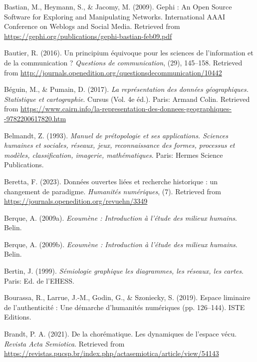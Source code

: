 \documentclass[
  a4paper,
  DIV=11,
  numbers=noendperiod]{scrreprt}
\newlength{\cslhangindent}
\newenvironment{CSLReferences}[2] %
 {\begin{list}{}{%
  \setlength{\itemindent}{0pt}
  \setlength{\leftmargin}{0pt}
  \setlength{\parsep}{0pt}
  \ifodd #1
   \setlength{\leftmargin}{\cslhangindent}
   \setlength{\itemindent}{-1\cslhangindent}
  \fi
  \setlength{\itemsep}{#2\baselineskip}}}
 {\end{list}}
\begin{document}
\begin{CSLReferences}{1}{0}
Bastian, M., Heymann, S., \& Jacomy, M. (2009). Gephi : An Open Source
Software for Exploring and Manipulating Networks. International AAAI
Conference on Weblogs and Social Media. Retrieved from
\url{https://gephi.org/publications/gephi-bastian-feb09.pdf}

Bautier, R. (2016). Un principium équivoque pour les sciences de
l{'}information et de la communication ? \emph{Questions de
communication}, (29), 145--158. Retrieved from
\url{http://journals.openedition.org/questionsdecommunication/10442}

Béguin, M., \& Pumain, D. (2017). \emph{La représentation des données
géographiques. Statistique et cartographie}. Cursus (Vol. 4e éd.).
Paris: Armand Colin. Retrieved from
\url{https://www.cairn.info/la-representation-des-donnees-geographiques--9782200617820.htm}

Belmandt, Z. (1993). \emph{Manuel de prétopologie et ses applications.
Sciences humaines et sociales, réseaux, jeux, reconnaissance des formes,
processus et modèles, classification, imagerie, mathématiques}. Paris:
Hermes Science Publications.

Beretta, F. (2023). Données ouvertes liées et recherche historique : un
changement de paradigme. \emph{Humanités numériques}, (7). Retrieved
from \url{https://journals.openedition.org/revuehn/3349}

Berque, A. (2009a). \emph{Ecoumène : Introduction à l'étude des milieux
humains}. Belin.

Berque, A. (2009b). \emph{Ecoumène : Introduction à l'étude des milieux
humains}. Belin.

Bertin, J. (1999). \emph{Sémiologie graphique les diagrammes, les
réseaux, les cartes}. Paris: Ed. de l'EHESS.

Bourassa, R., Larrue, J.-M., Godin, G., \& Szoniecky, S. (2019). Espace
liminaire de l{'}authenticité : Une démarche d{'}humanités numériques
(pp. 126--144). ISTE Editions.

Brandt, P. A. (2021). De la chorématique. Les dynamiques de l{'}espace
vécu. \emph{Revista Acta Semiotica}. Retrieved from
\url{https://revistas.pucsp.br/index.php/actasemiotica/article/view/54143}


\end{CSLReferences}
\end{document}
